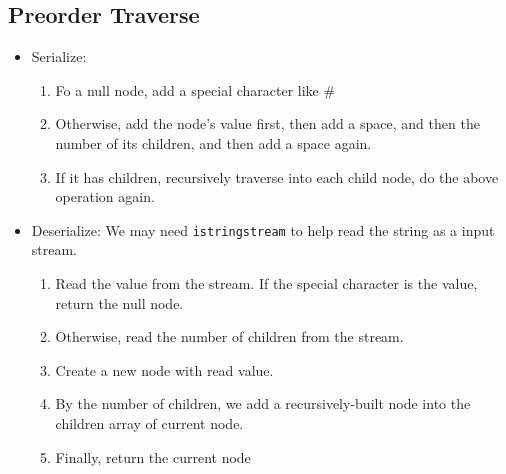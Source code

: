 \subsection{Preorder Traverse}
\begin{itemize}
\item Serialize: 
\begin{enumerate}
\item Fo a null node, add a special character like \#
\item Otherwise, add the node's value first, then add a space, and then the number of its children, and then add a space again.
\item If it has children, recursively traverse into each child node, do the above operation again.
\end{enumerate}
\item Deserialize: We may need \texttt{istringstream} to help read the string as a input stream.
\begin{enumerate}
\item Read the value from the stream. If the special character is the value, return the null node.
\item Otherwise, read the number of children from the stream. 
\item Create a new node with read value.
\item By the number of children, we add a recursively-built node into the children array of current node.
\item Finally, return the current node
\end{enumerate}
\end{itemize}

